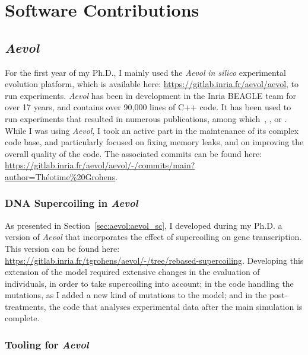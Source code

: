 \chapter{Software Contributions}
\label{chap:software}

\section{\emph{Aevol}}

For the first year of my Ph.D., I mainly used the \emph{Aevol} \emph{in silico} experimental evolution platform, which is available here: \url{https://gitlab.inria.fr/aevol/aevol}, to run experiments.
\emph{Aevol} has been in development in the Inria BEAGLE team for over 17 years, and contains over 90,000 lines of C++ code.
It has been used to run experiments that resulted in numerous publications, among which~\cite{knibbe2005}, \cite{batut2013}, or \cite{rutten2019}.
While I was using \emph{Aevol}, I took an active part in the maintenance of its complex code base, and particularly focused on fixing memory leaks, and on improving the overall quality of the code.
The associated commits can be found here: \url{https://gitlab.inria.fr/aevol/aevol/-/commits/main?author=Théotime%20Grohens}.

\subsection{DNA Supercoiling in \emph{Aevol}}

As presented in Section~\ref{sec:aevol:aevol_sc}, I developed during my Ph.D. a version of \emph{Aevol} that incorporates the effect of supercoiling on gene transcription.
This version can be found here: \url{https://gitlab.inria.fr/tgrohens/aevol/-/tree/rebased-supercoiling}.
Developing this extension of the model required extensive changes in the evaluation of individuals, in order to take supercoiling into account; in the code handling the mutations, as I added a new kind of mutations to the model; and in the post-treatments, the code that analyses experimental data after the main simulation is complete.

\subsection{Tooling for \emph{Aevol}}

